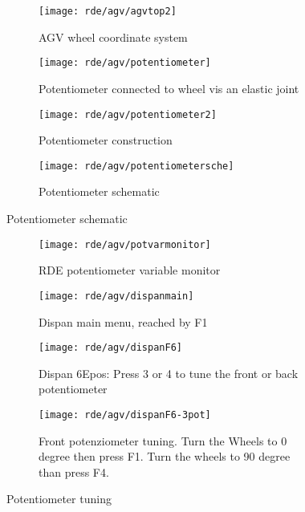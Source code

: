 \begin{figure}[h]
	\centering
	\begin{subfigure}{0.4\textwidth}
		\centering\texttt{[image: rde/agv/agvtop2]}
		\caption{AGV wheel coordinate system}
		\label{fig:agvwheelsystem}
	\end{subfigure}
	\qquad
	\begin{subfigure}{0.4\textwidth}
		\centering\texttt{[image: rde/agv/potentiometer]}
		\caption{Potentiometer connected to wheel vis an elastic joint}
		\label{fig:pot}
	\end{subfigure}
	
	\begin{subfigure}{0.4\textwidth}
		\centering\texttt{[image: rde/agv/potentiometer2]}
		\caption{Potentiometer construction}
		\label{fig:pot2}
	\end{subfigure}
	\begin{subfigure}{0.4\textwidth}
		\centering\texttt{[image: rde/agv/potentiometersche]}
		\caption{Potentiometer schematic}
		\label{fig:potschematic}
	\end{subfigure}
\end{figure}

\begin{figure}[h]
	\centering
	\begin{subfigure}{0.4\textwidth}
		\centering
		\texttt{[image: rde/agv/potvarmonitor]}
		\caption{RDE potentiometer variable monitor}
		\label{fig:potvarmonitor}
	\end{subfigure}

	\begin{subfigure}{0.4\textwidth}
		\centering\texttt{[image: rde/agv/dispanmain]}
		\caption{Dispan main menu, reached by F1}
		\label{fig:dispanmain}
	\end{subfigure}
		\qquad
	\begin{subfigure}{0.4\textwidth}
		\centering\texttt{[image: rde/agv/dispanF6]}
		\caption{Dispan 6Epos: Press 3 or 4 to tune the front or back potentiometer}
		\label{fig:dispanF6}
	\end{subfigure}
	\begin{subfigure}{0.4\textwidth}
		\centering\texttt{[image: rde/agv/dispanF6-3pot]}
		\caption{Front potenziometer tuning. Turn the Wheels to 0 degree then press F1. Turn the wheels to 90 degree than press F4.}
		\label{fig:dispanF6-3pot}
	\end{subfigure}
	\label{fig::potprog}
	\caption{Potentiometer tuning}
\end{figure}

